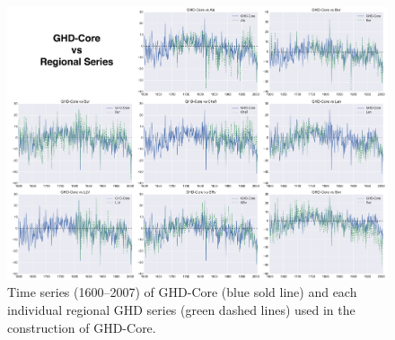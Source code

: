 \documentclass[12pt]{article}
\begin{document}
\begin{figure}
\center
\includegraphics[width=1.0\columnwidth,scale=2]{SUPP_fig_03_core_vs_sites.png}
\caption{Time series (1600--2007) of GHD-Core (blue sold line) and each individual regional GHD series (green dashed lines) used in the construction of GHD-Core.}
\end{figure}
\end{document}
